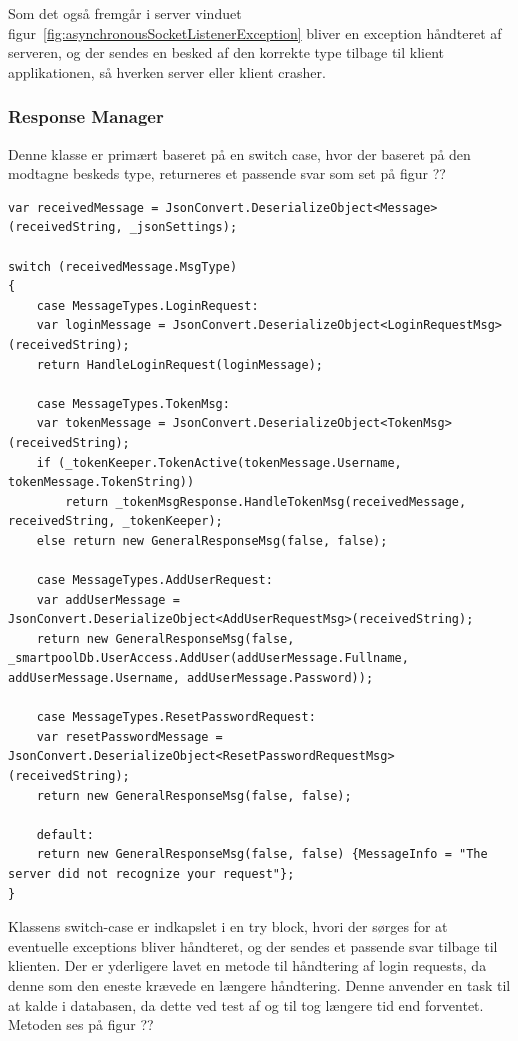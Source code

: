 Som det også fremgår i server vinduet figur~\ref{fig:asynchronousSocketListenerException} bliver en exception håndteret af serveren, og der sendes en besked af den korrekte type tilbage til klient applikationen, så hverken server eller klient crasher.

\subsubsection{Response Manager}
Denne klasse er primært baseret på en switch case, hvor der baseret på den modtagne beskeds type, returneres et passende svar som set på figur ??
\begin{lstlisting}[caption=Server.ResponseManager, label=code:Server.ResponseManager]
var receivedMessage = JsonConvert.DeserializeObject<Message>(receivedString, _jsonSettings);

switch (receivedMessage.MsgType)
{
	case MessageTypes.LoginRequest:
	var loginMessage = JsonConvert.DeserializeObject<LoginRequestMsg>(receivedString);
	return HandleLoginRequest(loginMessage);
	
	case MessageTypes.TokenMsg:
	var tokenMessage = JsonConvert.DeserializeObject<TokenMsg>(receivedString);
	if (_tokenKeeper.TokenActive(tokenMessage.Username, tokenMessage.TokenString))
		return _tokenMsgResponse.HandleTokenMsg(receivedMessage, receivedString, _tokenKeeper);
	else return new GeneralResponseMsg(false, false);
	
	case MessageTypes.AddUserRequest:
	var addUserMessage = JsonConvert.DeserializeObject<AddUserRequestMsg>(receivedString);
	return new GeneralResponseMsg(false, _smartpoolDb.UserAccess.AddUser(addUserMessage.Fullname, addUserMessage.Username, addUserMessage.Password));
	
	case MessageTypes.ResetPasswordRequest:
	var resetPasswordMessage = JsonConvert.DeserializeObject<ResetPasswordRequestMsg>(receivedString);
	return new GeneralResponseMsg(false, false);
	
	default:
	return new GeneralResponseMsg(false, false)	{MessageInfo = "The server did not recognize your request"};
}
\end{lstlisting}

Klassens switch-case er indkapslet i en try block, hvori der sørges for at eventuelle exceptions bliver håndteret, og der sendes et passende svar tilbage til klienten. Der er yderligere lavet en metode til håndtering af login requests, da denne som den eneste krævede en længere håndtering. Denne anvender en task til at kalde i databasen, da dette ved test af og til tog længere tid end forventet. Metoden ses på figur ??

